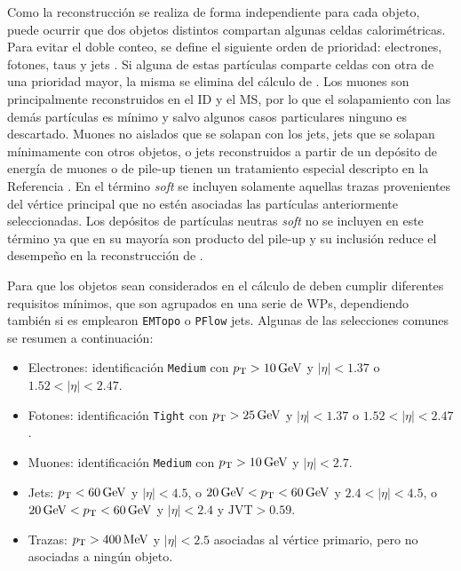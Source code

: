 Como la reconstrucción se realiza de forma independiente para cada objeto, puede ocurrir que dos objetos distintos compartan algunas celdas calorimétricas. Para evitar el doble conteo, se define el siguiente orden de prioridad: electrones, fotones, taus y jets \cite{PERF-2011-07, PERF-2014-04}. Si alguna de estas partículas comparte celdas con otra de una prioridad mayor, la misma se elimina del cálculo de \met. Los muones son principalmente reconstruidos en el ID y el MS, por lo que el solapamiento con las demás partículas es mínimo y salvo algunos casos particulares ninguno es descartado. Muones no aislados que se solapan con los jets, jets que se solapan mínimamente con otros objetos, o jets reconstruidos a partir de un depósito de energía de muones o de pile-up tienen un tratamiento especial descripto en la Referencia \cite{PERF-2016-07}. En el término \textit{soft} se incluyen solamente aquellas trazas provenientes del vértice principal que no estén asociadas las partículas anteriormente seleccionadas. Los depósitos de partículas neutras \textit{soft} no se incluyen en este término ya que en su mayoría son producto del pile-up y su inclusión reduce el desempeño en la reconstrucción de \met. 

Para que los objetos sean considerados en el cálculo de \met deben cumplir diferentes requisitos mínimos, que son agrupados en una serie de WPs, dependiendo también si es emplearon \texttt{EMTopo} o \texttt{PFlow} jets. Algunas de las selecciones comunes se resumen a continuación:

\begin{itemize}
  \item Electrones: identificación \texttt{Medium} con $p_{\text{T}}>10\,\text{GeV}$ y $|\eta|<1.37$ o $1.52<|\eta|<2.47$.
  \item Fotones: identificación \texttt{Tight} con $p_{\text{T}}>25\,\text{GeV}$ y $|\eta|<1.37$ o $1.52<|\eta|<2.47$.
  \item Muones: identificación \texttt{Medium} con $p_{\text{T}}>10\,\text{GeV}$ y $|\eta|<2.7$.
  \item Jets: $p_{\text{T}}<60\,\text{GeV}$ y $|\eta|<4.5$, o $20\,\text{GeV}<p_{\text{T}}<60\,\text{GeV}$ y $2.4<|\eta|<4.5$, o $20\,\text{GeV}<p_{\text{T}}<60\,\text{GeV}$ y $|\eta|<2.4$ y $\text{JVT}>0.59$.
  \item Trazas: $p_{\text{T}}>400\,\text{MeV}$ y $|\eta|<2.5$ asociadas al vértice primario, pero no asociadas a ningún objeto.
\end{itemize}






